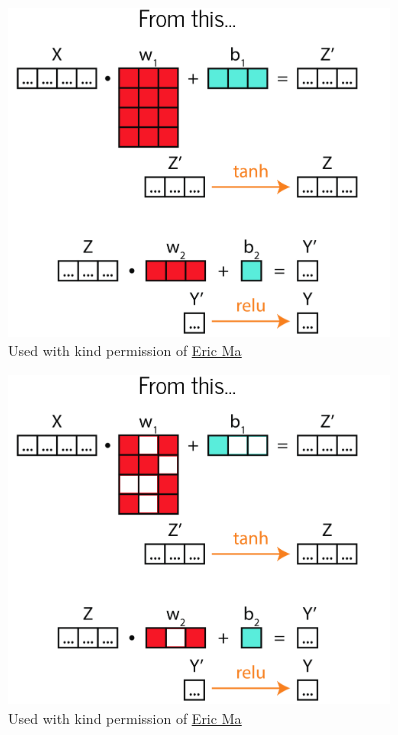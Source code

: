 \documentclass{beamer}
\newcommand{\mdlink}[2]{\href{#2}{\underline{#1}}}
\begin{document}
\begin{frame}
	\begin{figure}
		\centering
		\includegraphics[width = 0.9\textwidth]{im/going_bayesian1.png}
		\caption{Used with kind permission of \mdlink{Eric Ma}{https://ericmjl.github.io/}}
	\end{figure}
\end{frame}

\begin{frame}
	\begin{figure}
		\centering
		\includegraphics[width = 0.9\textwidth]{im/going_pruning.png}
		\caption{Used with kind permission of \mdlink{Eric Ma}{https://ericmjl.github.io/}}
	\end{figure}
\end{frame}
\end{document}
